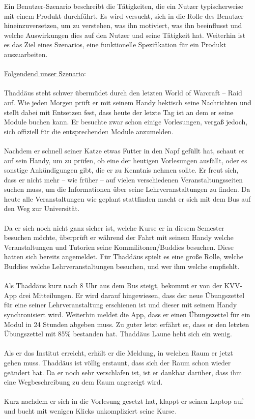 \documentclass{article}
\begin{document}
Ein Benutzer-Szenario beschreibt die Tätigkeiten, die ein Nutzer typischerweise mit einem Produkt durchführt. Es wird versucht, sich in die Rolle des Benutzer hineinzuversetzen, um zu verstehen, was ihn motiviert, was ihn beeinflusst und welche Auswirkungen dies auf den Nutzer und seine Tätigkeit hat. Weiterhin ist es das Ziel eines Szenarios, eine funktionelle Spezifikation für ein Produkt auszuarbeiten. \\
\\
\underline{Folgendend unser Szenario}:\\
\\
Thaddäus steht schwer übermüdet durch den letzten World of Warcraft – Raid auf. Wie jeden Morgen prüft er mit seinem Handy hektisch seine Nachrichten und stellt dabei mit Entsetzen fest, dass heute der letzte Tag ist an dem er seine Module buchen kann. Er besuchte zwar schon einige Vorlesungen, vergaß jedoch, sich offiziell für die entsprechenden Module anzumelden.\\
\\
Nachdem er schnell seiner Katze etwas Futter in den Napf gefüllt hat, schaut er auf sein Handy, um zu prüfen, ob eine der heutigen Vorlesungen ausfällt, oder es sonstige Ankündigungen gibt, die er zu Kenntnis nehmen sollte. Er freut sich, dass er nicht mehr – wie früher – auf vielen verschiedenen Veranstaltungsseiten suchen muss, um die Informationen über seine Lehrveranstaltungen zu finden. Da heute alle Veranstaltungen wie geplant stattfinden macht er sich mit dem Bus auf den Weg zur Universität.\\
\\
Da er sich noch nicht ganz sicher ist, welche Kurse er in diesem Semester besuchen möchte, überprüft er während der Fahrt mit seinem Handy welche Veranstaltungen und Tutorien seine Kommilitonen/Buddies besuchen. Diese hatten sich bereits angemeldet. Für Thaddäus spielt es eine große Rolle, welche Buddies welche Lehrveranstaltungen besuchen, und wer ihm welche empfiehlt.\\
\\
Als Thaddäus kurz nach 8 Uhr aus dem Bus steigt, bekommt er von der KVV-App drei Mitteilungen. Er wird darauf hingewiesen, dass der neue Übungszettel für eine seiner Lehrveranstaltung erschienen ist und dieser mit seinem Handy synchronisiert wird. Weiterhin meldet die App, dass er einen Übungszettel für ein Modul in 24 Stunden abgeben muss. Zu guter letzt erfährt er, dass er den letzten Übungszettel mit 85\% bestanden hat. Thaddäus Laune hebt sich ein wenig.\\
\\
Als er das Institut erreicht, erhält er die Meldung, in welchen Raum er jetzt gehen muss. Thaddäus ist völlig erstaunt, dass sich der Raum schon wieder geändert hat. Da er noch sehr verschlafen ist, ist er dankbar darüber, dass ihm eine Wegbeschreibung zu dem Raum angezeigt wird.\\
\\
Kurz nachdem er sich in die Vorlesung gesetzt hat, klappt er seinen Laptop auf und bucht mit wenigen Klicks unkompliziert seine Kurse.
\end{document}
